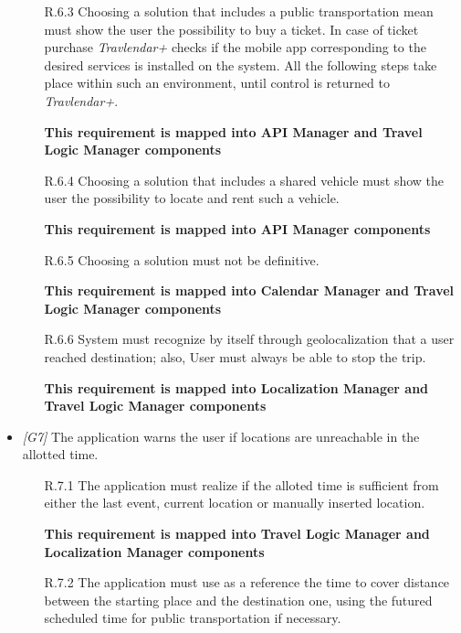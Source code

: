 \begin{itemize}
\begin{itemize}
			\item [R.6.3] Choosing a solution that includes a public transportation mean must show the user the possibility to buy a ticket. In case of ticket purchase \textit{Travlendar+} checks if the mobile app corresponding to the desired services is installed on the system. All the following steps take place within such an environment, until control is returned to \textit{Travlendar+}.

			\textbf{This requirement is mapped into API Manager and Travel Logic Manager components}

			\item [R.6.4] Choosing a solution that includes a shared vehicle must show the user the possibility to locate and rent such a vehicle.
			
			\textbf{This requirement is mapped into API Manager components}

			\item [R.6.5] Choosing a solution must not be definitive.
			
			\textbf{This requirement is mapped into Calendar Manager and Travel Logic Manager components}

			\item [R.6.6] System must recognize by itself through geolocalization that a user reached destination; also, User must always be able to stop the trip.
			
			\textbf{This requirement is mapped into Localization Manager and Travel Logic Manager components}

		\end{itemize}

                  

                  

	\item \textit{[G7]} The application warns the user if locations are unreachable in the allotted time.

		\begin{itemize}

			\item[R.7.1] The application must realize if the alloted time is sufficient from either the last event, current location or manually inserted location.
			
			\textbf{This requirement is mapped into Travel Logic Manager and Localization Manager components}

			\item[R.7.2] The application must use as a reference the time to cover distance between the starting place and the destination one, using the futured scheduled time for public transportation if necessary.
			

\end{itemize}
\end{itemize}
